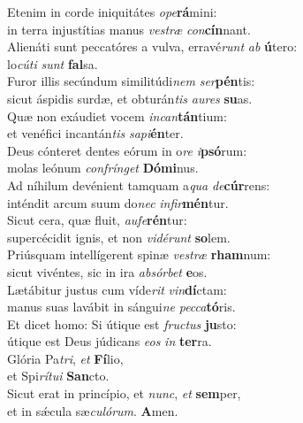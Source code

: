 \evenverse Etenim in corde iniquitátes \textit{o}\textit{pe}\textbf{rá}mini:~\*\\
\evenverse in terra injustítias manus \textit{ve}\textit{stræ} \textit{con}\textbf{cín}nant.\\
\oddverse Alienáti sunt peccatóres a vulva, erravé\textit{runt} \textit{ab} \textbf{ú}tero:~\*\\
\oddverse lo\textit{cú}\textit{ti} \textit{sunt} \textbf{fal}sa.\\
\evenverse Furor illis secúndum similitúdi\textit{nem} \textit{ser}\textbf{pén}tis:~\*\\
\evenverse sicut áspidis surdæ, et obturán\textit{tis} \textit{au}\textit{res} \textbf{su}as.\\
\oddverse Quæ non exáudiet vocem \textit{in}\textit{can}\textbf{tán}tium:~\*\\
\oddverse et venéfici incantán\textit{tis} \textit{sa}\textit{pi}\textbf{én}ter.\\
\evenverse Deus cónteret dentes eórum in o\textit{re} \textit{i}\textbf{psó}rum:~\*\\
\evenverse molas leónum \textit{con}\textit{frín}\textit{get} \textbf{Dó}\textbf{mi}nus.\\
\oddverse Ad níhilum devénient tamquam a\textit{qua} \textit{de}\textbf{cúr}rens:~\*\\
\oddverse inténdit arcum suum do\textit{nec} \textit{in}\textit{fir}\textbf{mén}tur.\\
\evenverse Sicut cera, quæ fluit, \textit{au}\textit{fe}\textbf{rén}tur:~\*\\
\evenverse supercécidit ignis, et non \textit{vi}\textit{dé}\textit{runt} \textbf{so}lem.\\
\oddverse Priúsquam intellígerent spinæ \textit{ve}\textit{stræ} \textbf{rham}num:~\*\\
\oddverse sicut vivéntes, sic in ira \textit{ab}\textit{sór}\textit{bet} \textbf{e}os.\\
\evenverse Lætábitur justus cum víde\textit{rit} \textit{vin}\textbf{dí}ctam:~\*\\
\evenverse manus suas lavábit in sángui\textit{ne} \textit{pec}\textit{ca}\textbf{tó}ris.\\
\oddverse Et dicet homo: Si útique est \textit{fru}\textit{ctus} \textbf{ju}sto:~\*\\
\oddverse útique est Deus júdicans \textit{e}\textit{os} \textit{in} \textbf{ter}ra.\\
\evenverse Glória Pa\textit{tri}, \textit{et} \textbf{Fí}lio,~\*\\
\evenverse et Spi\textit{rí}\textit{tu}\textit{i} \textbf{San}cto.\\
\oddverse Sicut erat in princípio, et \textit{nunc}, \textit{et} \textbf{sem}per,~\*\\
\oddverse et in sǽcula sæ\textit{cu}\textit{ló}\textit{rum}. \textbf{A}men.\\
